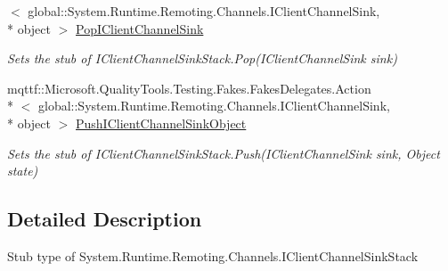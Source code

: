 \begin{DoxyCompactItemize}
$<$ global\-::\-System.\-Runtime.\-Remoting.\-Channels.\-I\-Client\-Channel\-Sink, \\*
object $>$ \hyperlink{class_system_1_1_runtime_1_1_remoting_1_1_channels_1_1_fakes_1_1_stub_i_client_channel_sink_stack_a001c1bc3364f777ebcfb68646521a008}{Pop\-I\-Client\-Channel\-Sink}
\begin{DoxyCompactList}\small\item\em Sets the stub of I\-Client\-Channel\-Sink\-Stack.\-Pop(\-I\-Client\-Channel\-Sink sink)\end{DoxyCompactList}\item 
mqttf\-::\-Microsoft.\-Quality\-Tools.\-Testing.\-Fakes.\-Fakes\-Delegates.\-Action\\*
$<$ global\-::\-System.\-Runtime.\-Remoting.\-Channels.\-I\-Client\-Channel\-Sink, \\*
object $>$ \hyperlink{class_system_1_1_runtime_1_1_remoting_1_1_channels_1_1_fakes_1_1_stub_i_client_channel_sink_stack_a0e3deddd374ff2b97ff7fa72d1f01b1b}{Push\-I\-Client\-Channel\-Sink\-Object}
\begin{DoxyCompactList}\small\item\em Sets the stub of I\-Client\-Channel\-Sink\-Stack.\-Push(\-I\-Client\-Channel\-Sink sink, Object state)\end{DoxyCompactList}\end{DoxyCompactItemize}


\subsection{Detailed Description}
Stub type of System.\-Runtime.\-Remoting.\-Channels.\-I\-Client\-Channel\-Sink\-Stack




